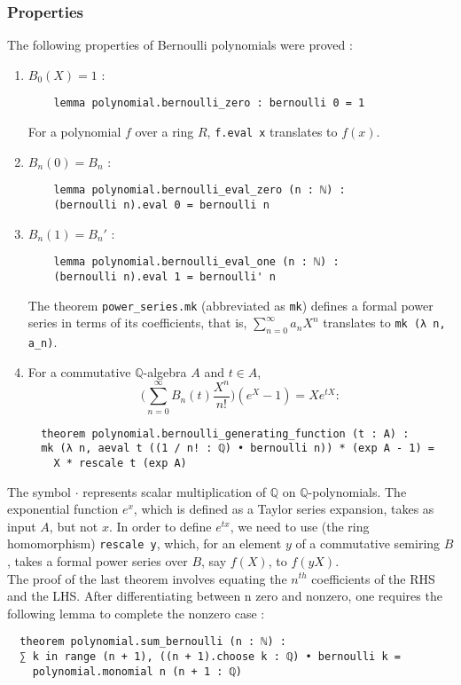\documentclass[11pt]{article}
\newcommand{\lean}[1]{\texttt{#1}\xspace} %
\begin{document}
\subsubsection{Properties}
The following properties of Bernoulli polynomials were proved :
\begin{enumerate}
  \item $ B_0(X) = 1 $ : \begin{lstlisting}
    lemma polynomial.bernoulli_zero : bernoulli 0 = 1
  \end{lstlisting}
  For a polynomial $f$ over a ring $R$, \lean{f.eval x} translates to $f(x)$.
  \item $ B_n(0) = B_n $ : \begin{lstlisting}
    lemma polynomial.bernoulli_eval_zero (n : ℕ) : 
    (bernoulli n).eval 0 = bernoulli n
  \end{lstlisting}
  \item $ B_n(1) = B_n' $ : \begin{lstlisting}
    lemma polynomial.bernoulli_eval_one (n : ℕ) : 
    (bernoulli n).eval 1 = bernoulli' n
  \end{lstlisting}
  The theorem \lean{power\_series.mk} (abbreviated as \lean{mk}) defines a formal power series in terms of its
  coefficients, that is, $\sum_{n = 0}^{\infty} a_n X^n$ translates to \lean{mk (λ n, a\_n)}.
  \item For a commutative $\mathbb{Q}$-algebra $A$ and $t \in A$, 
  $$ \bigg( \sum_{n = 0}^{\infty} B_n(t) \frac{X^n}{n!} \bigg) (e^X - 1) = X e^{tX} : $$
  \begin{lstlisting}
  theorem polynomial.bernoulli_generating_function (t : A) :
  mk (λ n, aeval t ((1 / n! : ℚ) • bernoulli n)) * (exp A - 1) = 
    X * rescale t (exp A)
  \end{lstlisting}
\end{enumerate} 
The symbol \lean{$\cdot$} represents scalar multiplication of $\mathbb{Q}$ on $\mathbb{Q}$-polynomials. 
The exponential function $e^{x}$, which is defined as a Taylor series expansion,
takes as input $A$, but not $x$. In order to define $e^{tx}$, we need to use
(the ring homomorphism) \lean{rescale y}, which, for an element $y$ of a commutative semiring $B$,
takes a formal power series over $B$, say $f(X)$, to $f(yX)$. \\

The proof of the last theorem involves equating the $n^{th}$ coefficients of the RHS and the LHS.
After differentiating between n zero and nonzero, one requires the following lemma to complete the
nonzero case :
\begin{lstlisting}
  theorem polynomial.sum_bernoulli (n : ℕ) :
  ∑ k in range (n + 1), ((n + 1).choose k : ℚ) • bernoulli k =
    polynomial.monomial n (n + 1 : ℚ)
\end{lstlisting}
\end{document}
